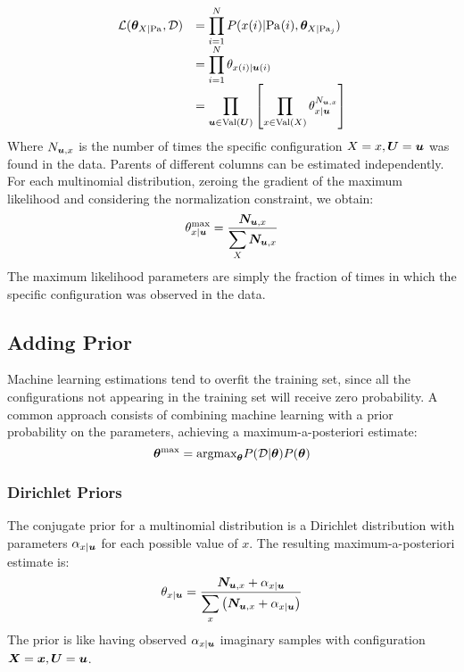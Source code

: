 \[
  \begin{array}{ll}    
    \mathcal{L}(\bm{\theta}_{X\vert\text{Pa}_{}},\mathcal{D})&=\displaystyle\prod_{i=1}^NP(x(i)\vert\text{Pa}_{}(i),\bm{\theta}_{X\vert\text{Pa}_{j}})\\
                                                        &=\displaystyle\prod_{i=1}^N\theta_{x(i)\vert\bm{u}(i)}\\
                                                        &=\displaystyle\prod_{\bm{u}\in\text{Val}\left({\bm{U}}\right)}\left[\displaystyle\prod_{x\in\text{Val}\left({X}\right)}\theta_{x\vert\bm{u}}^{N_{\bm{u},x}}\right]
  \end{array}
\]
Where $N_{\bm{u},x}$ is the number of times the specific configuration $X=x,\bm{U}=\bm{u}$ was found in the data.
Parents of different columns can be estimated independently. \newline
For each multinomial distribution, zeroing the gradient of the maximum likelihood and considering the normalization constraint, we obtain:
\[\theta_{x\vert\bm{u}}^{\text{max}}=\frac{\bm{N}_{\bm{u},x}}{\displaystyle\sum_X\bm{N}_{\bm{u},x}}\]
The maximum likelihood parameters are simply the fraction of times in which the specific configuration was observed in the data.
%
%
\subsection{Adding Prior}
Machine learning estimations tend to overfit the training set, since all the configurations not appearing in the training set will receive zero probability. \newline
A common approach consists of combining machine learning with a prior probability on the parameters, achieving a maximum-a-posteriori estimate:
\[\bm{\theta}^{\text{max}}=\text{argmax}_{\bm{\theta}}P(\mathcal{D}\vert\bm{\theta})P(\bm{\theta})\]
%
\subsubsection{Dirichlet Priors}
The conjugate prior for a multinomial distribution is a Dirichlet distribution with parameters $\alpha_{x\vert\bm{u}}$ for each possible value of $x$. \newline
The resulting maximum-a-posteriori estimate is:
\[\theta_{x\vert\bm{u}}=\frac{\bm{N}_{\bm{u},x}+\alpha_{x\vert\bm{u}}}{\displaystyle\sum_x\left(\bm{N}_{\bm{u},x}+\alpha_{x\vert\bm{u}}\right)}\]
The prior is like having observed $\alpha_{x\vert\bm{u}}$ imaginary samples with configuration $\bm{X}=\bm{x},\bm{U}=\bm{u}$.
%
%
